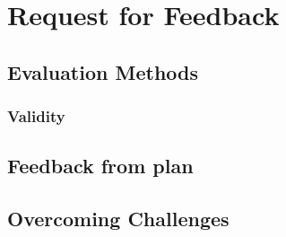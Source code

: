 \chapter{Request for Feedback}\label{C:feedback}

\section{Evaluation Methods}

\subsection{Validity}

\section{Feedback from plan}

\section{Overcoming Challenges}